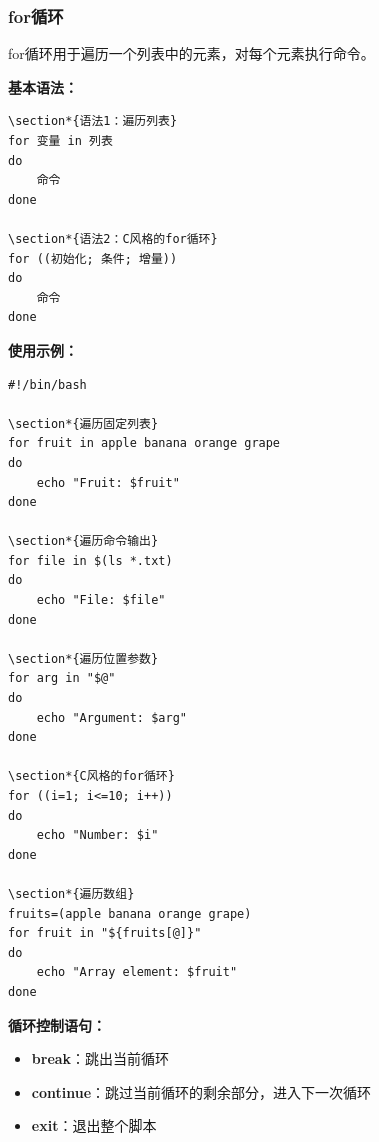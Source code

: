 \documentclass[12pt,UTF8]{ctexbook}
\begin{document}
\subsubsection{for循环}
for循环用于遍历一个列表中的元素，对每个元素执行命令。

\textbf{基本语法：}
\begin{verbatim}
\section*{语法1：遍历列表}
for 变量 in 列表
do
    命令
done

\section*{语法2：C风格的for循环}
for ((初始化; 条件; 增量))
do
    命令
done
\end{verbatim}

\textbf{使用示例：}
\begin{verbatim}
#!/bin/bash

\section*{遍历固定列表}
for fruit in apple banana orange grape
do
    echo "Fruit: $fruit"
done

\section*{遍历命令输出}
for file in $(ls *.txt)
do
    echo "File: $file"
done

\section*{遍历位置参数}
for arg in "$@"
do
    echo "Argument: $arg"
done

\section*{C风格的for循环}
for ((i=1; i<=10; i++))
do
    echo "Number: $i"
done

\section*{遍历数组}
fruits=(apple banana orange grape)
for fruit in "${fruits[@]}"
do
    echo "Array element: $fruit"
done
\end{verbatim}

\textbf{循环控制语句：}
\begin{itemize}
    \item \textbf{break}：跳出当前循环
    \item \textbf{continue}：跳过当前循环的剩余部分，进入下一次循环
    \item \textbf{exit}：退出整个脚本
\end{itemize}
\end{document}
